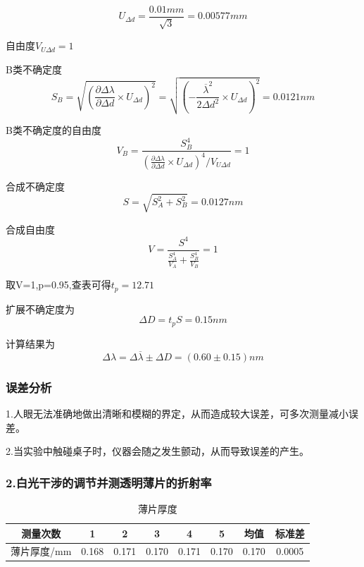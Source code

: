 \documentclass[12pt,a4paper,UTF8]{ctexart}
\begin{document}
\begin{equation*}
	U_{\varDelta d}=\frac{0.01mm}{\sqrt{3}}=0.00577mm
\end{equation*}

自由度$V_{U \varDelta d}=1$

B类不确定度
\begin{equation*}
	S_B=\sqrt{{\left( \frac{\partial \varDelta \lambda}{\partial \varDelta d}\times U_{\varDelta d}\right) }^2}=
	\sqrt{{\left( -\frac{\overline{\lambda}^2}{2 \varDelta d^2}\times U_{\varDelta d}\right) }^2}=0.0121nm
\end{equation*}

B类不确定度的自由度
\begin{equation*}
	V_B=\frac{S_B^4}{\left( \frac{\partial \varDelta \lambda}{\partial \varDelta d}\times U_{\varDelta d}\right) ^4 / V_{U \varDelta d}}=1
\end{equation*}

合成不确定度
\begin{equation*}
	S= \sqrt{S_A^2+S_B^2}=0.0127nm
\end{equation*}

合成自由度
\begin{equation*}
	V=\frac{S^4}{ \frac{S_A^4}{V_A}+ \frac{S_B^4}{V_B}}=1
\end{equation*}

取V=1,p=0.95,查表可得$t_p=12.71$

扩展不确定度为
\begin{equation*}
	\varDelta D=t_p S =0.15nm
\end{equation*}

计算结果为
\begin{equation*}
	\varDelta \lambda=\varDelta \overline{\lambda}\pm \varDelta D=(0.60\pm0.15)nm
\end{equation*}

\subsubsection*{误差分析}
1.人眼无法准确地做出清晰和模糊的界定，从而造成较大误差，可多次测量减小误差。

2.当实验中触碰桌子时，仪器会随之发生颤动，从而导致误差的产生。

\subsubsection*{2.白光干涉的调节并测透明薄片的折射率}

\begin{table}[htbp]
	\centering
	\caption{薄片厚度}
	\begin{tabular}{cccccccc}
	\toprule
    测量次数 & 1 & 2 & 3 & 4 & 5  & 均值 & 标准差\\
	\midrule
	薄片厚度/mm & 0.168 & 0.171 & 0.170 & 0.171 & 0.170 &0.170 &0.0005 \\
	\bottomrule
	\end{tabular}%
	\label{tab:device}%
\end{table}%
\end{document}
